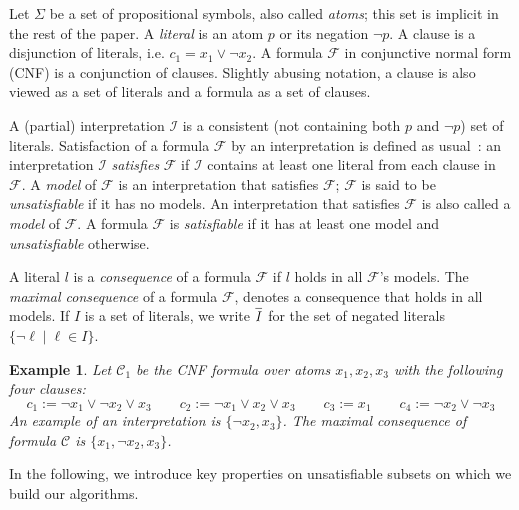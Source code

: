 \documentclass[twoside,11pt]{article}
\newcommand\m[1]{\mathcal{#1}}
\newtheorem{example}{Example}
\newcommand\comment[1]{\marginpar{\tiny #1}}
\renewcommand\comment[1]{#1}
\newcommand{\emilio}[1]{{\comment{\color{red}Emilio: #1}}}
\newcommand{\bart}[1]{{\comment{\color{OliveGreen}Bart: #1}}}
\newcommand\formula{\ensuremath{\m{F} }\xspace}
\newcommand\formulac{\ensuremath{\m{C} }\xspace}
\newcommand\voc{\ensuremath{\Sigma}\xspace}
\begin{document}
Let \voc be a set of propositional symbols, also called \emph{atoms}; this set is implicit in the rest of the paper. A \emph{literal} is an atom $p$ or its negation $\lnot p$. 
A clause is a disjunction of literals, i.e. $c_1 = x_1 \vee \lnot x_2 $. A formula $\formula$ in conjunctive normal form (CNF) is a conjunction of clauses. 
Slightly abusing notation, a clause is also viewed as a set of literals and a formula as a set of clauses. 

A (partial) interpretation $\m{I}$ is a consistent (not containing both $p$ and $\lnot p$) set of literals. 
Satisfaction of a formula \formula by an interpretation is defined as usual~\cite{faia/2009-185}: 
an interpretation $\m{I}$ \emph{satisfies} \formula if $\m{I}$ contains at least one literal from each clause in $\formula$.
A \emph{model} of \formula is an interpretation that satisfies \formula; $\formula$ is said to be \emph{unsatisfiable} if it has no models.
An interpretation that satisfies $\formula$ is also called a \emph{model} of \formula. 
A formula \formula is \emph{satisfiable} if it has at least one model and \emph{unsatisfiable} otherwise. 

A literal $l$ is a \emph{consequence} of a formula \formula if $l$ holds in all $\formula$'s models. The \emph{maximal consequence} of a formula \formula, denotes a consequence that holds in all models.
If $I$ is a set of literals, we write $\mathbf{\overline{ \raisebox{0pt}[1.1\height]{\textit{I}}}}$  for the set of negated literals $\{\lnot \ell \mid \ell \in I\}$.

\begin{example}\label{example:intro1}
	Let $\formulac_1$ be the CNF formula over atoms $x_1, x_2, x_3$ with the following four clauses:
	\[ c_1 := \lnot x_1 \vee \lnot x_2 \vee x_3 \qquad  c_2 := \lnot x_1 \vee  x_2 \vee x_3 \qquad  c_3 := x_1 \qquad c_4 := \lnot x_2 \vee \lnot x_3 \]
	An example of an interpretation is $\{\lnot x_2, x_3\}$. The \emph{maximal consequence} of formula $\formulac$ is $\{x_1, \lnot x_2, x_3\}$.
\end{example}

In the following, we introduce key properties on unsatisfiable subsets on which we build our algorithms.
\end{document}
